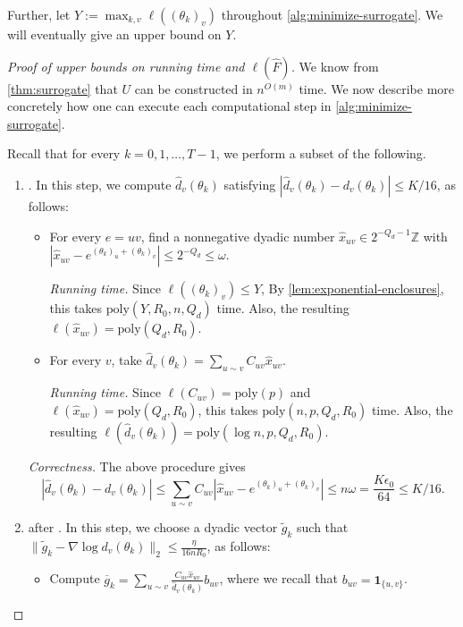 \documentclass[11pt,reqno,letterpaper]{amsart}
\numberwithin{equation}{section}
\theoremstyle{definition}
\theoremstyle{remark}
\newcommand{\norm}[1]{\lVert #1\rVert}
\begin{document}
Further,  let $Y:=\max_{k,v}\ell((\theta_k)_v)$ throughout \cref{alg:minimize-surrogate}. We will eventually give an upper bound on $Y$.



\begin{proof}[Proof of upper bounds on running time and $\ell(\widehat F)$] We know from \cref{thm:surrogate} that $U$ can be constructed in $n^{O(m)}$ time.
    We now describe more concretely how one can execute each computational step in \cref{alg:minimize-surrogate}.


Recall that for every $k=0,1,\dots,T-1$, we perform a subset of the following.
\begin{enumerate}[leftmargin=*]
    \item {}. In this step, we compute $\widehat d_v(\theta_k)$ satisfying
$|\widehat d_v(\theta_k)-d_v(\theta_k)|\le K/16$, as follows:
\begin{itemize}[leftmargin=*]
    \item For every $e=uv$, find a nonnegative dyadic number
$\widehat x_{uv}\in 2^{-Q_d-1}\mathbb Z$ with
$|\widehat x_{uv}-e^{(\theta_k)_u+(\theta_k)_v}|\le  2^{-Q_d}\leq \omega$.

\textit{Running time.} Since $\ell((\theta_k)_v)\leq Y$,
By \cref{lem:exponential-enclosures},  this takes $\text{poly}(Y,R_0,n,Q_d)$ time. Also, the resulting $\ell(\widehat x_{uv})=\text{poly}(Q_d,R_0)$.

\item For every $v$, take $ \widehat d_v(\theta_k)=\sum_{u\sim v}C_{uv}\widehat x_{uv}$. 

\textit{Running time.} Since $\ell(C_{uv})=\text{poly}(p)$ and $\ell(\widehat x_{uv})=\text{poly}(Q_d,R_0)$, this takes $\text{poly}(n,p,Q_d,R_0)$ time. Also, the resulting $\ell(\widehat d_v(\theta_k))=\text{poly}(\log n,p,Q_d,R_0)$. 
\end{itemize}

\noindent \textit{Correctness.} The above procedure gives $$|\widehat d_v(\theta_k)- d_v(\theta_k)|\leq \sum_{u\sim v}C_{uv}|\widehat x_{uv}-e^{(\theta_k)_u+(\theta_k)_v}|\leq  n\omega=\frac{K\epsilon_0}{64}\leq K/16.$$
    \item {} after . In this step, we choose a dyadic  vector $\widetilde g_k$ such that $\norm{\widetilde g_k-\nabla\log d_v(\theta_k)}_2\le\frac{\eta}{16nR_0}$, as follows:
    \begin{itemize}[leftmargin=*]
        \item Compute $ \overline g_k=\sum_{u\sim v}
       \frac{C_{uv}\widehat x_{uv}}{\widehat d_v(\theta_k)}b_{uv}$,
where we recall that $b_{uv}=\mathbf 1_{\{u,v\}}$.




\end{itemize}
\end{enumerate}
\end{proof}
\end{document}
